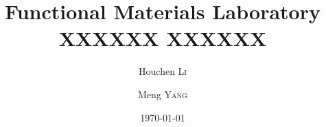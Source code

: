 \title{Functional Materials Laboratory \\ XXXXXX XXXXXX} %

\author[*]{Houchen \textsc{Li}} %
\author[*]{Meng \textsc{Yang}}

\date{\today} %
